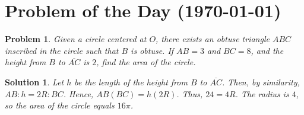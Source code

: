 \documentclass[12pt]{article}
\newtheorem*{problem}{Problem}
\newtheorem*{solution}{Solution}
\begin{document}
\section*{Problem of the Day (\today)}

\begin{problem}
Given a circle centered at $O$, there exists an obtuse triangle $ABC$ inscribed in the circle such that $B$ is obtuse. If $AB=3$ and $BC=8$, and the height from $B$ to $\overline{AC}$ is $2$, find the area of the circle.
\end{problem}

\begin{solution}
Let $h$ be the length of the height from $B$ to $\overline{AC}$. Then, by similarity, $AB:h=2R:BC$. Hence, $AB(BC)=h(2R)$. Thus, $24=4R$. The radius is $4$, so the area of the circle equals $16\pi$.
\end{solution}
\end{document}
